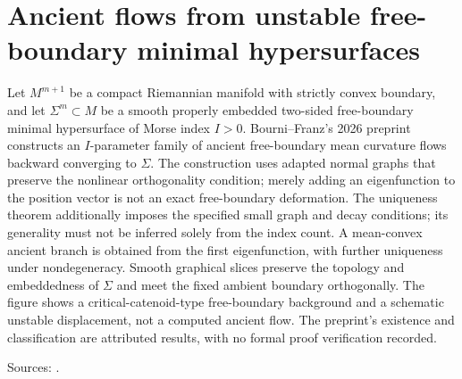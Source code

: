 \chapter{Ancient flows from unstable free-boundary minimal hypersurfaces}\label{sec:catalogue-unstable-free-boundary-ancient}
\begin{example}\label{ex:catalogue-unstable-free-boundary-ancient}
Let $M^{m+1}$ be a compact Riemannian manifold with strictly convex boundary, and let $\Sigma^m\subset M$ be a smooth properly embedded two-sided free-boundary minimal hypersurface of Morse index $I>0$. Bourni--Franz's 2026 preprint constructs an $I$-parameter family of ancient free-boundary mean curvature flows backward converging to $\Sigma$. The construction uses adapted normal graphs that preserve the nonlinear orthogonality condition; merely adding an eigenfunction to the position vector is not an exact free-boundary deformation.
The uniqueness theorem additionally imposes the specified small graph and decay conditions; its generality must not be inferred solely from the index count. A mean-convex ancient branch is obtained from the first eigenfunction, with further uniqueness under nondegeneracy. Smooth graphical slices preserve the topology and embeddedness of $\Sigma$ and meet the fixed ambient boundary orthogonally. The figure shows a critical-catenoid-type free-boundary background and a schematic unstable displacement, not a computed ancient flow. The preprint's existence and classification are attributed results, with no formal proof verification recorded.
\par Sources: \cite{CatBourniFranz2026}.
\end{example}

